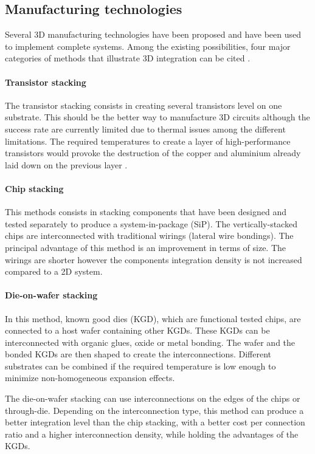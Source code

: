 \subsection{Manufacturing technologies}

Several 3D manufacturing technologies have been proposed and have been used to implement complete systems. Among the existing possibilities, four major categories of methods that illustrate 3D integration can be cited \cite{659500,1652906}.

\paragraph{Transistor stacking}

The transistor stacking consists in creating several transistors level on one substrate. This should be the better way to manufacture 3D circuits although the success rate are currently limited due to thermal issues among the different limitations. The required temperatures to create a layer of high-performance transistors would provoke the destruction of the copper and aluminium already laid down on the previous layer \cite{659500}.

\paragraph{Chip stacking}

This methods consists in stacking components that have been designed and tested separately to produce a system-in-package (SiP). The vertically-stacked chips are interconnected with traditional wirings (lateral wire bondings). The principal advantage of this method is an improvement in terms of size. The wirings are shorter however the components integration density is not increased compared to a 2D system.

\paragraph{Die-on-wafer stacking}

In this method, known good dies (KGD), which are functional tested chips, are connected to a host wafer containing other KGDs. These KGDs can be interconnected with organic glues, oxide or metal bonding. The wafer and the bonded KGDs are then shaped to create the interconnections. Different substrates can be combined if the required temperature is low enough to minimize non-homogeneous expansion effects.

The die-on-wafer stacking can use interconnections on the edges of the chips or through-die. Depending on the interconnection type, this method can produce a better integration level than the chip stacking, with a better cost per connection ratio and a higher interconnection density, while holding the advantages of the KGDs.


